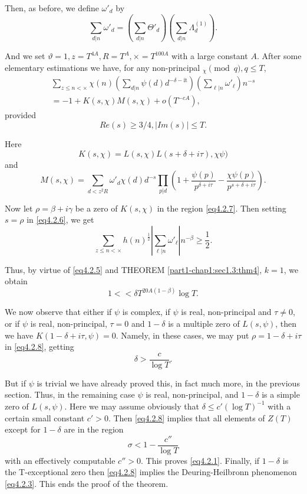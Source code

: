 Then, as before, we define $\omega '_d$ by
$$
\sum_{d | n} \omega '_d = \left(\sum_{d | n} \Theta'_d\right)
\left(\sum_{d | n} \Lambda_d^{(1)}\right). 
$$

And we set $\vartheta = 1, z = T^{4A}, R = T^A, \times = T^{100A}$
with a large constant $A$. After some elementary estimations we have,
for any non-principal $_\chi \pmod{q}, q \leq T$, 
\begin{multline*}
  \sum_{z \leq n < \times}  \chi (n) \left(\sum_{d | n} \psi (d) d^{-
    \delta - \text {it}}\right) \left(\sum _{\ell | n} \omega
  '_\ell\right) n^{-s}\\  
  = -1 + K(s, \chi ) M(s, \chi ) + o (T^{-cA}), \tag{4.2.6}\label{eq4.2.6}
\end{multline*}
provided
\begin{equation*}
  Re(s) \geq 3/4, | Im(s) | \leq T. \tag{4.2.7}\label{eq4.2.7}
\end{equation*}

Here\pageoriginale
$$
K(s, \chi) = L(s, \chi) L(s + \delta + i \tau), \chi \psi)
$$
and
$$
M(s, \chi) = \sum_{d < z^{2} R} \omega '_{d} \chi (d) d^{-s} \prod_{p
  | d} \left(1 + \frac{\psi (p)}{p^{\delta + i \tau}} - \frac{\chi \psi
  (p)}{p ^{s + \delta + i \tau}}\right). 
$$

Now let $\rho = \beta + i \gamma$ be a zero of $K(s, \chi)$ in the
region \eqref{eq4.2.7}.  Then setting $s = \rho$ in \eqref{eq4.2.6}, we get  
$$
\sum_{z \leq n < \times} h(n)^{\frac{1}{2}} | \sum_{\ell | n} \omega
'_\ell | n^{-\beta } \geq \frac{1}{2}. 
$$

Thus, by virtue of \eqref{eq4.2.5} and THEOREM \ref{part1-chap1:sec1.3:thm4}, 
$k = 1$, we obtain 
\begin{equation*}
  1 << \delta T^{20 A (1- \beta )} \log T. \tag{4.2.8}\label{eq4.2.8}
\end{equation*} 
 
 We now observe that either if $\psi$ is complex, if $\psi$ is real,
 non-principal and $\tau \neq 0$, or if $\psi$ is real, non-principal,
 $\tau = 0$ and $1 - \delta$ is a multiple zero of $L(s, \psi)$, then
 we have $K(1-\delta + i \tau, \psi) = 0$. Namely, in these cases, we
 may put $\rho = 1-\delta + i \tau$ in \eqref{eq4.2.8}, getting 
 $$
 \delta > \frac{c}{\log T}.
 $$
 
 But if $\psi$ is trivial we have already proved this, in fact much
 more, in the previous section. Thus, in the remaining case $\psi$ is
 real, non-principal, and $1 -  \delta$ is a simple zero of $L(s,
 \psi)$. Here we may assume obviously that $\delta \le c' (\log
 T)^{-1}$ with a certain small constant $c' > 0$. Then \eqref{eq4.2.8} implies
 that all elements of $Z(T)$\pageoriginale except for $1  - \delta$ are in the
 region 
$$
\sigma < 1 - \frac{c''}{\log T}
$$
with an effectively computable $c'' > 0$. This proves \eqref{eq4.2.1}. Finally,
if $1 -  \delta$ is the T-exceptional zero then \eqref{eq4.2.8} implies the
Deuring-Heilbronn phenomenon \eqref{eq4.2.3}. This ends the proof of the
theorem. 

